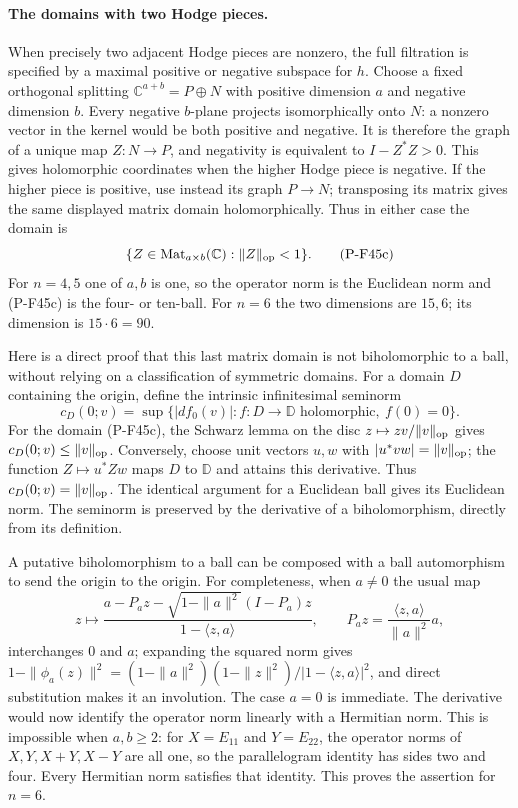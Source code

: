 \documentclass[11pt,a4paper]{article}
\begin{document}
\paragraph{The domains with two Hodge pieces.}
When precisely two adjacent Hodge pieces are nonzero,
the full filtration is specified by a maximal positive
or negative subspace for $h$. Choose a fixed orthogonal
splitting $\mathbb C^{a+b}=P\oplus N$ with positive
dimension $a$ and negative dimension $b$. Every negative
$b$-plane projects isomorphically onto $N$: a nonzero
vector in the kernel would be both positive and negative.
It is therefore the graph of a unique map $Z:N\to P$,
and negativity is equivalent to $I-Z^*Z>0$. This gives
holomorphic coordinates when the higher Hodge piece is
negative. If the higher piece is positive, use instead
its graph $P\to N$; transposing its matrix gives the
same displayed matrix domain holomorphically. Thus in
either case the domain is
\[
              \{Z\in\operatorname{Mat}_{a\times b}(\mathbb C):
                        \|Z\|_{\rm op}<1\}.
 \tag{P-F45c}
\]
For $n=4,5$ one of $a,b$ is one, so the operator norm is
the Euclidean norm and (P-F45c) is the four- or ten-ball.
For $n=6$ the two dimensions are $15,6$; its dimension
is $15\cdot6=90$.

Here is a direct proof that this last matrix domain is
not biholomorphic to a ball, without relying on a
classification of symmetric domains. For a domain $D$
containing the origin, define the intrinsic infinitesimal
seminorm
\[
 c_D(0;v)=\sup\{|df_0(v)|:f:D\to\mathbb D
                  \text{ holomorphic},\ f(0)=0\}.
\]
For the domain (P-F45c), the Schwarz lemma on the disc
$z\mapsto z v/\|v\|_{\rm op}$ gives
$c_D(0;v)\le\|v\|_{\rm op}$. Conversely, choose unit
vectors $u,w$ with $|u^*vw|=\|v\|_{\rm op}$; the function
$Z\mapsto u^*Zw$ maps $D$ to $\mathbb D$ and attains
this derivative. Thus $c_D(0;v)=\|v\|_{\rm op}$.
The identical argument for a Euclidean ball gives its
Euclidean norm. The seminorm is preserved by the
derivative of a biholomorphism, directly from its definition.

A putative biholomorphism to a ball can be composed with
a ball automorphism to send the origin to the origin.
For completeness, when $a\ne0$ the usual map
\[
 z\longmapsto
 \frac{a-P_a z-\sqrt{1-\|a\|^2}(I-P_a)z}
      {1-\langle z,a\rangle},
 \qquad P_a z=\frac{\langle z,a\rangle}{\|a\|^2}a,
\]
interchanges $0$ and $a$; expanding the squared norm
gives
$1-\|\phi_a(z)\|^2=(1-\|a\|^2)(1-\|z\|^2)
/|1-\langle z,a\rangle|^2$, and direct substitution makes
it an involution. The case $a=0$ is immediate.
The derivative would now identify the operator norm
linearly with a Hermitian norm. This is impossible when
$a,b\ge2$: for $X=E_{11}$ and $Y=E_{22}$, the operator
norms of $X,Y,X+Y,X-Y$ are all one, so the parallelogram
identity has sides two and four. Every Hermitian norm
satisfies that identity. This proves the assertion for
$n=6$.
\end{document}
